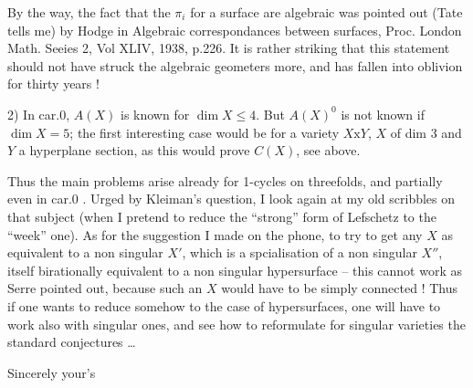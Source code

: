 
By the way, the fact that the $\pi_i$ for a surface are algebraic was pointed out (Tate tells me) by Hodge in Algebraic correspondances between surfaces, Proc. London Math.  Seeies 2, Vol XLIV, 1938, p.226. It is rather striking that this statement should not have struck the algebraic geometers more, and has fallen into oblivion for  thirty years !

2) In car.0, $A(X)$ is known for $\dim X\leq4$. But $A(X)^0$ is not known if $\dim X=5$; the first interesting case would be for a variety $X\mathrm{x}Y$, $X$ of dim 3 and $Y$ a hyperplane section, as this would prove $C(X)$, see above.

Thus the main problems arise already for 1-cycles on threefolds, and partially even in car.0 . Urged by Kleiman's question, I  look again at my old scribbles on that subject (when I pretend to reduce the ``strong'' form of Lefschetz to the ``week'' one). As for the suggestion I made on the phone, to try to get any $X$ as  equivalent to a non singular $X'$, which is a spcialisation of a non singular $X''$, itself birationally equivalent to a non singular hypersurface -- this cannot work as Serre pointed out, because such an $X$ would have to be simply connected ! Thus if one wants to reduce somehow to the case of hypersurfaces, one will have to work also with singular ones, and see how to reformulate for singular varieties the standard conjectures \ldots

Sincerely your's

